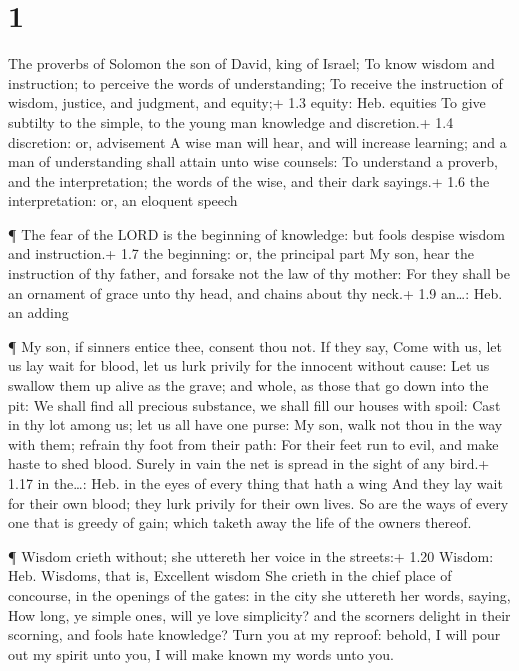 \hypertarget{section}{%
\section{1}\label{section}}

 The proverbs of Solomon the son of David, king of Israel;
 To know wisdom and instruction; to perceive the words of
understanding;  To receive the instruction of wisdom,
justice, and judgment, and equity;+ 1.3 equity: Heb. equities
 To give subtilty to the simple, to the young man knowledge
and discretion.+ 1.4 discretion: or, advisement  A wise man
will hear, and will increase learning; and a man of understanding shall
attain unto wise counsels:  To understand a proverb, and the
interpretation; the words of the wise, and their dark sayings.+ 1.6 the
interpretation: or, an eloquent speech

 ¶ The fear of the LORD is the beginning of knowledge: but
fools despise wisdom and instruction.+ 1.7 the beginning: or, the
principal part  My son, hear the instruction of thy father,
and forsake not the law of thy mother:  For they shall be an
ornament of grace unto thy head, and chains about thy neck.+ 1.9
an\ldots: Heb. an adding

 ¶ My son, if sinners entice thee, consent thou not.
 If they say, Come with us, let us lay wait for blood, let
us lurk privily for the innocent without cause:  Let us
swallow them up alive as the grave; and whole, as those that go down
into the pit:  We shall find all precious substance, we
shall fill our houses with spoil:  Cast in thy lot among
us; let us all have one purse:  My son, walk not thou in
the way with them; refrain thy foot from their path:  For
their feet run to evil, and make haste to shed blood. 
Surely in vain the net is spread in the sight of any bird.+ 1.17 in
the\ldots: Heb. in the eyes of every thing that hath a wing
 And they lay wait for their own blood; they lurk privily
for their own lives.  So are the ways of every one that is
greedy of gain; which taketh away the life of the owners thereof.

 ¶ Wisdom crieth without; she uttereth her voice in the
streets:+ 1.20 Wisdom: Heb. Wisdoms, that is, Excellent wisdom
 She crieth in the chief place of concourse, in the
openings of the gates: in the city she uttereth her words, saying,
 How long, ye simple ones, will ye love simplicity? and the
scorners delight in their scorning, and fools hate knowledge?
 Turn you at my reproof: behold, I will pour out my spirit
unto you, I will make known my words unto you.

